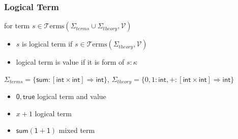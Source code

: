 \documentclass[12pt,aspectratio=169]{beamer}
\newcommand{\m}[1]{\mathsf{#1}}
\newcommand{\mi}[1]{\mathit{#1}}
\newcommand{\VV}{\mathcal{V}}
\newcommand{\TT}{\mathcal{T}}
\newcommand{\Terms}{\TT\mathrm{erms}}
\newcommand{\Stheory}{\Sigma_\mi{theory}}
\newcommand{\Sterms}{\Sigma_\mi{terms}}
\begin{document}
\begin{frame}
    \frametitle{Logical Term}

    \begin{definition}
        for term $s \in \Terms(\Sterms \cup \Stheory, \VV)$
        \begin{itemize}
            \item $s$ is \alert{logical term} if $s \in \Terms(\Stheory, \VV)$
            \item logical term is \alert{value} if it is form of $s : \kappa$
        \end{itemize}
    \end{definition}

    \begin{example}
        $\Sterms = \{\m{sum}: [\m{int} \times \m{int}] \Rightarrow \m{int}\}$,
        $\Stheory=\{0,1 : \m{int}, +:[\m{int} \times \m{int}] \Rightarrow \m{int}\}$
        \begin{itemize}
            \item $\m{0},\m{true}$ \quad logical term and value
            \item $x + 1$ \quad logical term
            \item $\m{sum}{(\m{1} + \m{1})}$ \quad mixed term
        \end{itemize}
    \end{example}
\end{frame}
\end{document}
